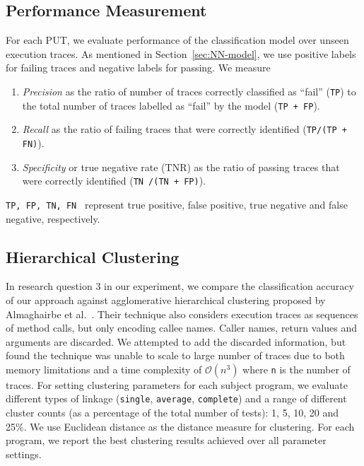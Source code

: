 \subsection{Performance Measurement}
For each PUT, we evaluate performance of the classification model over unseen execution traces. As mentioned in Section~\ref{sec:NN-model}, we use positive labels for failing traces and negative labels for passing. We measure 
\begin{enumerate}
 \item \emph{Precision} as the ratio of number of traces correctly classified as ``fail'' (\texttt{TP}) 
to the total number of traces labelled as ``fail'' by the model (\texttt{TP + FP}). 
 \item \emph{Recall} as the ratio of failing traces that were correctly identified  (\texttt{TP/(TP + FN)}). 
 \item \emph{Specificity} or true negative rate (TNR) as the ratio of passing traces that were correctly identified (\texttt{TN /(TN + FP)}).
\end{enumerate}
\texttt{TP, FP, TN, FN } represent true positive, false positive, true negative and false negative, respectively.  

\subsection{Hierarchical Clustering}
In research question 3 in our experiment, we compare the classification accuracy of our approach against agglomerative hierarchical clustering proposed by Almaghairbe et al.~\cite{almaghairbe2017separating}. Their technique also considers execution traces as sequences of method calls, but only encoding callee names. Caller names, return values and arguments are discarded. We attempted to add the discarded information, but found the technique was unable to scale to large number of traces due to both memory limitations and a time complexity of $\mathcal{O}(n^3)$ where \texttt{n} is the number of traces. For setting clustering parameters for each subject program, we evaluate different types of linkage (\texttt{single}, \texttt{average}, \texttt{complete}) and a range of different cluster counts (as a percentage of the total number of tests): 1, 5, 10, 20 and 25\%. We use Euclidean distance as the distance measure for clustering. For each program, we report the best clustering results achieved over all parameter settings. 

